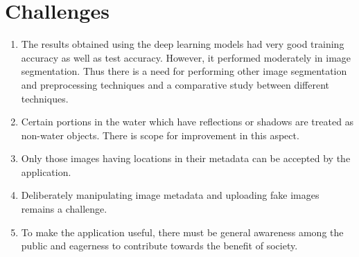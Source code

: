 \documentclass{IEEEtran}
\begin{document}
\section{Challenges}
\begin{enumerate}
\item The results obtained using the deep learning models had very good training accuracy as well as test accuracy. However, it performed moderately in image segmentation. Thus there is a need for performing other image segmentation and preprocessing     techniques and a comparative study between different techniques.
\item Certain portions in the water which have reflections or shadows are treated as non-water objects. There is scope for improvement in this aspect.
\item Only those images having locations in their metadata can be accepted by the application.
\item Deliberately manipulating image metadata and uploading fake images remains a challenge. 
\item To make the application useful, there must be general awareness among the public and eagerness to contribute towards the benefit of society. 

\end{enumerate}

\end{document}
